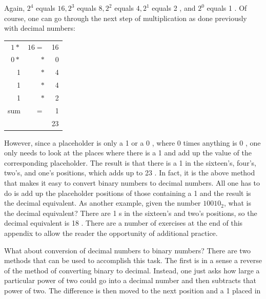 \documentclass[10pt]{article}
\begin{document}
Again, $2^{4}$ equals $16,2^{3}$ equals $8,2^{2}$ equals $4,2^{1}$ equals 2 , and $2^{0}$ equals 1 . Of course, one can go through the next step of multiplication as done previously with decimal numbers:

\begin{center}
\begin{tabular}{rrr}
$1 *$ & $16=$ & 16 \\
$0 *$ & $*$ & 0 \\
1 & $*$ & 4 \\
1 & $*$ & 4 \\
1 & $*$ & 2 \\
\hline
sum & $=$ & 1 \\
\hline
 &  & 23 \\
\hline
\end{tabular}
\end{center}

However, since a placeholder is only a 1 or a 0 , where 0 times anything is 0 , one only needs to look at the places where there is a 1 and add up the value of the corresponding placeholder. The result is that there is a 1 in the sixteen's, four's, two's, and one's positions, which adds up to 23 . In fact, it is the above method that makes it easy to convert binary numbers to decimal numbers. All one has to do is add up the placeholder positions of those containing a 1 and the result is the decimal equivalent. As another example, given the number $10010_{2}$, what is the decimal equivalent? There are 1 s in the sixteen's and two's positions, so the decimal equivalent is 18 . There are a number of exercises at the end of this appendix to allow the reader the opportunity of additional practice.

What about conversion of decimal numbers to binary numbers? There are two methods that can be used to accomplish this task. The first is in a sense a reverse of the method of converting binary to decimal. Instead, one just asks how large a particular power of two could go into a decimal number and then subtracts that power of two. The difference is then moved to the next position and a 1 placed in
\end{document}
